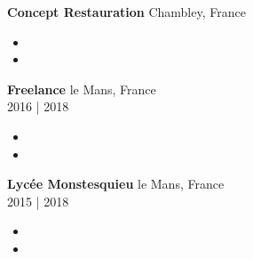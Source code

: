 \documentclass[a4paper]{article}
\newcommand\en[1]{}
\newcommand\fr[1]{}
\begin{document}
    \textbf{Concept Restauration}
        \hfill Chambley, France\\
        \en{ \textit{Service worker} \hfill Summer of 2019\\}
        \fr{ \textit{Personnel de service} \hfill été 2019\\}
        \vspace{-1mm}
        \begin{itemize} \itemsep 1pt
            \item
                \en{set up, cooking, inventory management}
                \fr{Mise en place, cuisine, gestion des stocks}
            \item
                \en{Work in difficult situations, stress management}
                \fr{Travail en situation difficiles, gestion du stress}
        \end{itemize}
    \textbf{Freelance}
        \hfill le Mans, France\\
        \en{ \textit{Web development}}
        \fr{ \textit{Développement web}}
        \hfill 2016 | 2018\\
        \vspace{-1mm}
        \begin{itemize} \itemsep 1pt
            \item
                \en{Creation of designs in accordance to the will of the clients}
                \fr{Relations clientèle}
            \item
                \en{Deadline estimation, programming and server management}
                \fr{Estimation de deadlines, programmation et gestion de serveurs}
        \end{itemize}
    \textbf{Lycée Monstesquieu}
        \hfill le Mans, France\\
        \en{\textit{Volunteer}}
        \fr{\textit{Bénévol}}
        \hfill 2015 | 2018\\
        \vspace{-1mm}
        \begin{itemize} \itemsep 1pt
            \item
                \en{Organization of all of the big events}
                \fr{Organisation de tous les gros évènements}
            \item
                \en{Maintenance: painting and moving equipment}
                \fr{Participation à l'entretien du lycée: peinture, déménagements, (...)}
        \end{itemize}
    \en{\textbf{General Hospital}}
\end{document}
